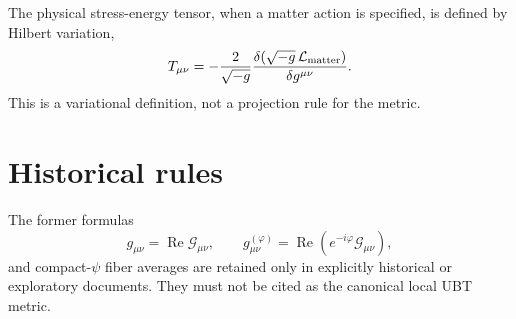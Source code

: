 \documentclass[11pt,a4paper]{article}
\begin{document}
The physical stress-energy tensor, when a matter action is specified, is
defined by Hilbert variation,
\[
 T_{\mu\nu}=-\frac{2}{\sqrt{-g}}
 \frac{\delta(\sqrt{-g}\,\mathcal L_{\rm matter})}{\delta g^{\mu\nu}}.
\]
This is a variational definition, not a projection rule for the metric.

\section{Historical rules}

The former formulas
\[
 g_{\mu\nu}=\operatorname{Re}\mathcal G_{\mu\nu},
 \qquad
 g_{\mu\nu}^{(\varphi)}=\operatorname{Re}
   (e^{-i\varphi}\mathcal G_{\mu\nu}),
\]
and compact-$\psi$ fiber averages are retained only in explicitly historical
or exploratory documents.  They must not be cited as the canonical local UBT
metric.
\end{document}
